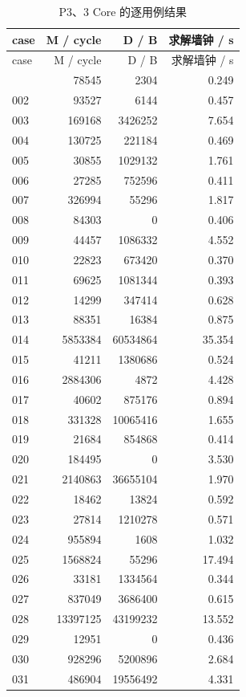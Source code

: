 \documentclass[anonymous,notoc]{gmcm2026}
\begin{document}
\begin{longtable}{lrrr}
\caption{P3、3 Core 的逐用例结果}\\
\toprule
case & M / cycle & D / B & 求解墙钟 / s\\\midrule
\endfirsthead
\toprule
case & M / cycle & D / B & 求解墙钟 / s\\\midrule
\endhead
\bottomrule\endfoot
001 & 78545 & 2304 & 0.249 \\
002 & 93527 & 6144 & 0.457 \\
003 & 169168 & 3426252 & 7.654 \\
004 & 130725 & 221184 & 0.469 \\
005 & 30855 & 1029132 & 1.761 \\
006 & 27285 & 752596 & 0.411 \\
007 & 326994 & 55296 & 1.817 \\
008 & 84303 & 0 & 0.406 \\
009 & 44457 & 1086332 & 4.552 \\
010 & 22823 & 673420 & 0.370 \\
011 & 69625 & 1081344 & 0.393 \\
012 & 14299 & 347414 & 0.628 \\
013 & 88351 & 16384 & 0.875 \\
014 & 5853384 & 60534864 & 35.354 \\
015 & 41211 & 1380686 & 0.524 \\
016 & 2884306 & 4872 & 4.428 \\
017 & 40602 & 875176 & 0.894 \\
018 & 331328 & 10065416 & 1.655 \\
019 & 21684 & 854868 & 0.414 \\
020 & 184495 & 0 & 3.530 \\
021 & 2140863 & 36655104 & 1.970 \\
022 & 18462 & 13824 & 0.592 \\
023 & 27814 & 1210278 & 0.571 \\
024 & 955894 & 1608 & 1.032 \\
025 & 1568824 & 55296 & 17.494 \\
026 & 33181 & 1334564 & 0.344 \\
027 & 837049 & 3686400 & 0.615 \\
028 & 13397125 & 43199232 & 13.552 \\
029 & 12951 & 0 & 0.436 \\
030 & 928296 & 5200896 & 2.684 \\
031 & 486904 & 19556492 & 4.331 \\

\end{longtable}
\end{document}
